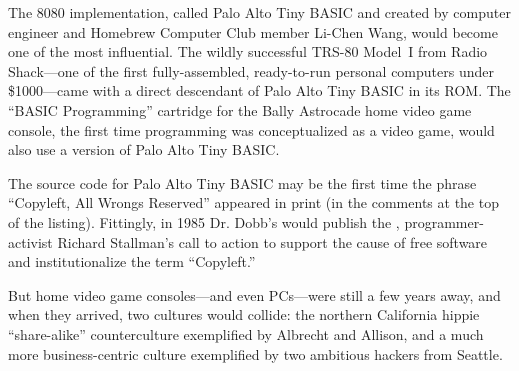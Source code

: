The 8080 implementation, called Palo Alto Tiny BASIC and created by computer engineer
and Homebrew Computer Club member Li-Chen Wang, would become one of the
most influential.
The wildly successful TRS-80 Model~I from Radio Shack---one of the first 
fully-assembled, ready-to-run
personal computers under \$1000---came with a direct descendant of
Palo Alto Tiny BASIC in its ROM.
The ``BASIC Programming'' cartridge for the Bally Astrocade
home video game console, the first time programming
was conceptualized as a video game,
would also use a version of Palo Alto Tiny
BASIC.

\begin{tangent}
The source code for Palo Alto Tiny BASIC may be the first time
the phrase ``Copyleft, All Wrongs Reserved'' appeared in print (in the
comments at the top of the listing).
Fittingly, in 1985 Dr. Dobb's would publish the ,
programmer-activist Richard Stallman's call to action to support the
cause of free software and institutionalize the term ``Copyleft.''
\end{tangent}

But home video game consoles---and even PCs---were still a few years
away, and when they arrived, two cultures would collide: the northern
California hippie ``share-alike'' counterculture exemplified by Albrecht
and Allison, and a much more business-centric culture exemplified by
two ambitious hackers from Seattle.



